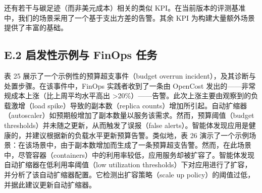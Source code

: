 \documentclass[10pt,UTF8,fontset=fandol]{ctexart}
\begin{document}
还有若干与碳足迹（而非美元成本）相关的类似 KPI。在当前版本的评测基准中，我们的场景采用了一个基于支出方差的告警。其余 KPI 为构建大量额外场景提供了丰富的基础。

\subsection{E.2 启发性示例与 FinOps 任务}

表 25 展示了一个示例性的预算超支事件（budget overrun incident），及其诊断与处置步骤。在该事件中，FinOps 实践者收到了一条由 OpenCost 发出的——非常规成本上涨（比上周平均水平高出 >20\%）——告警。此次上涨主要由观察到的负载激增（load spike）导致的副本数（replica counts）增加所引起。自动扩缩器（autoscaler）如预期般增加了副本数量以服务该需求。然而，预算阈值（budget thresholds）并未随之更新，从而触发了误报（false alerts）。智能体发现应用是健康的，并建议根据新的负载水平更新预算告警。类似地，表 26 演示了一个示例场景：在该场景中，由于副本数增加而生成了一条预算超支告警。然而，在此场景中，尽管容器（containers）中的利用率较低，应用服务却被扩容了。智能体发现自动扩缩器在低利用率阈值（low utilization thresholds）下对应用进行了扩容，并分析了该自动扩缩器配置。它检测出扩容策略（scale up policy）的阈值过低，并据此建议更新自动扩缩器。
\end{document}
